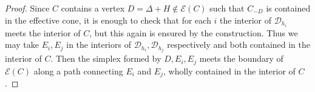 \documentclass[a4paper,12pt]{amsart}
\begin{document}
\begin{proof}
	Since $C$ contains a vertex $D=\Delta+H \notin \mathcal{E}(C)$ such that $C_{-D}$ is contained in the effective cone, it is enough to check that for each $i$ the interior of $\mathcal{D}_{h_{i}}$ meets the interior of $C$, but this again is ensured by the construction. Thus we may take $E_{i},E_{j}$ in the interiors of $\mathcal{D}_{h_{i}},\mathcal{D}_{h_{j}}$ respectively and both contained in the interior of $C$. Then the simplex formed by $D,E_{i},E_{j}$ meets the boundary of $\mathcal{E}(C)$ along a path connecting $E_{i}$ and $E_{j}$, wholly contained in the interior of $C$.

\end{proof}
%	
%
%	
%	
%	
%	
\end{document}
